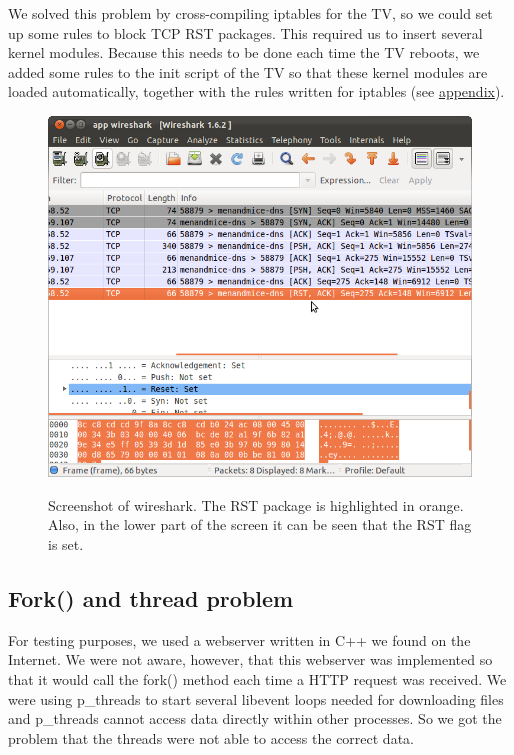 We solved this problem by cross-compiling iptables\cite{iptables} for the TV, so we could set up some rules to block TCP RST packages. This required us to insert several kernel modules. Because this needs to be done each time the TV reboots, we added some rules to the init script of the TV so that these kernel modules are loaded automatically, together with the rules written for iptables (see \hyperref[sec:vusb_init]{appendix}).

\begin{center}
\begin{figure}[h]
	\centering
	\mbox{\includegraphics[width=1.2\textwidth]{Images/tcp_rst.png}}
	\label{fig:TCP_RST}
	\caption{Screenshot of wireshark. The RST package is highlighted in orange. Also, in the lower part of the screen it can be seen that the RST flag is set.}
\end{figure}
\end{center}

\subsection{Fork() and thread problem}
For testing purposes, we used a webserver written in C++ we found on the Internet. We were 
not aware, however, that this webserver was implemented so that it would call the fork() 
method each time a HTTP request was received. We were using p\_threads\cite{thread} to start several libevent\cite{libevent} loops needed for downloading files and p\_threads cannot access data directly within other processes. So we got the problem that the threads were not able to access the correct data.

